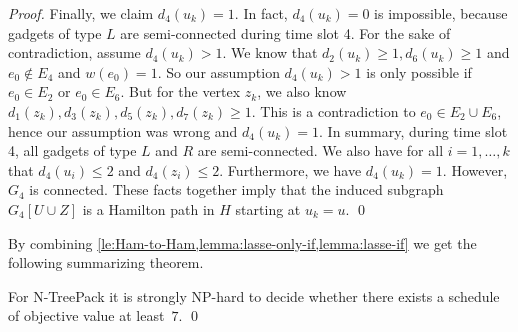 \documentclass[runningheads]{llncs}
\newcommand{\xxxNTP}{{\sc N-TreePack}}
\newcommand{\lasse}[1]{#1}
\begin{document}
\begin{proof}
Finally, we claim $d_4(u_k) = 1$. In fact, $d_4(u_k) = 0$ is impossible, because gadgets of type $L$ are semi-connected during time slot 4. For the sake of contradiction, assume $d_4(u_k) > 1$. We know that $d_2(u_k) \geq 1, d_6(u_k) \geq 1$ and $e_0 \not\in E_4$ and $w(e_0) = 1$. So our assumption $d_4(u_k) > 1$ is only possible if $e_0 \in E_2$ or $e_0 \in E_6$. But for the vertex $z_k$, we also know $d_1(z_k), d_3(z_k), d_5(z_k), d_7(z_k) \geq 1$. This is a contradiction to $e_0 \in E_2 \cup E_6$, hence our assumption was wrong and $d_4(u_k) = 1$.
In summary, during time slot 4, all gadgets of type $L$ and $R$ are semi-connected. We also have for all $i=1,\dots,k$ that $d_4(u_i) \leq 2$ and $d_4(z_i) \leq 2$. \lasse{Furthermore, we have} $d_4(u_k) = 1$. However, $G_4$ is connected. These facts together imply that the induced subgraph $G_4[U \cup Z]$ is a Hamilton path in $H$ starting at $u_k = u$.
\qed
\end{proof}

By combining \cref{le:Ham-to-Ham,lemma:lasse-only-if,lemma:lasse-if} we get
the following summarizing theorem.
\begin{theorem}
\label{th:value=7}
For {\xxxNTP} it is strongly NP-hard to decide whether there exists a schedule
of objective value at least~$7$.
\qed
\end{theorem}
\end{document}
